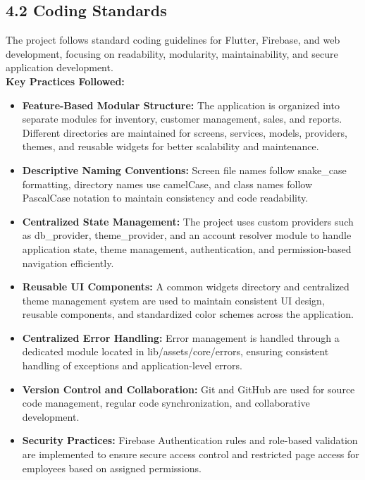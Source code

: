 \documentclass[12pt, oneside]{article}
\begin{document}
\subsection*{4.2 Coding Standards}
The project follows standard coding guidelines for Flutter, Firebase, and web development, focusing on readability, modularity, maintainability, and secure application development.\\[0.25cm]
\textbf{Key Practices Followed:}
\begin{itemize}
    \item \textbf{Feature-Based Modular Structure:} The application is organized into separate modules for inventory, customer management, sales, and reports. Different directories are maintained for screens, services, models, providers, themes, and reusable widgets for better scalability and maintenance.
    \item \textbf{Descriptive Naming Conventions:} Screen file names follow snake\_case formatting, directory names use camelCase, and class names follow PascalCase notation to maintain consistency and code readability.
    \item \textbf{Centralized State Management:} The project uses custom providers such as db\_provider, theme\_provider, and an account resolver module to handle application state, theme management, authentication, and permission-based navigation efficiently.
    \item \textbf{Reusable UI Components:} A common widgets directory and centralized theme management system are used to maintain consistent UI design, reusable components, and standardized color schemes across the application.
    \item \textbf{Centralized Error Handling:} Error management is handled through a dedicated module located in lib/assets/core/errors, ensuring consistent handling of exceptions and application-level errors.
    \item \textbf{Version Control and Collaboration:} Git and GitHub are used for source code management, regular code synchronization, and collaborative development.
    \item \textbf{Security Practices:} Firebase Authentication rules and role-based validation are implemented to ensure secure access control and restricted page access for employees based on assigned permissions.
\end{itemize}
\end{document}
